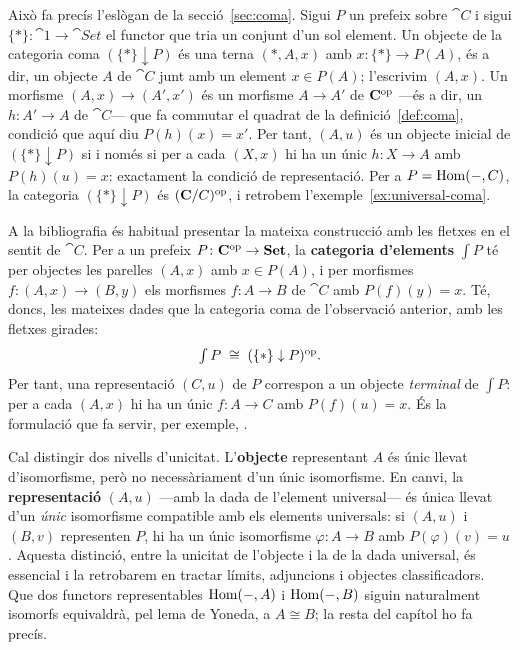 \begin{observacio}\label{obs:representacio-inicial}
Això fa precís l'eslògan de la secció~\ref{sec:coma}. Sigui
$P$ un prefeix sobre $\cat{C}$ i sigui
$\{\ast\}\colon\cat{1}\to\cat{Set}$ el functor que tria un conjunt d'un sol
element. Un objecte de la categoria coma $(\{\ast\}\downarrow P)$ és una terna
$(\ast,A,x)$ amb $x\colon\{\ast\}\to P(A)$, és a dir, un objecte $A$ de
$\cat{C}$ junt amb un element $x\in P(A)$; l'escrivim $(A,x)$. Un morfisme
$(A,x)\to(A',x')$ és un morfisme $A\to A'$ de $\mathbf{C}^{\mathrm{op}}$ ---és a dir, un
$h\colon A'\to A$ de $\cat{C}$--- que fa commutar el quadrat de la
definició~\ref{def:coma}, condició que aquí diu $P(h)(x)=x'$. Per tant,
$(A,u)$ és un objecte inicial de $(\{\ast\}\downarrow P)$ si i només si per a
cada $(X,x)$ hi ha un únic $h\colon X\to A$ amb $P(h)(u)=x$: exactament la
condició de representació. Per a $P=\operatorname{Hom}(-,C)$, la categoria
$(\{\ast\}\downarrow P)$ és $(\mathbf{C}/C)^{\mathrm{op}}$, i retrobem
l'exemple~\ref{ex:universal-coma}.
\end{observacio}

\begin{observacio}\label{obs:categoria-elements}
A la bibliografia és habitual presentar la mateixa construcció amb les fletxes en el sentit de $\cat{C}$. Per a un prefeix $P\colon\mathbf{C}^{\mathrm{op}}\to\mathbf{Set}$, la \textbf{categoria d'elements} $\textstyle\int P$ té per objectes les parelles $(A,x)$ amb $x\in P(A)$, i per morfismes $f\colon(A,x)\to(B,y)$ els morfismes $f\colon A\to B$ de $\cat{C}$ amb $P(f)(y)=x$. Té, doncs, les mateixes dades que la categoria coma de l'observació anterior, amb les fletxes girades:
\[
\textstyle\int P\;\cong\;(\{\ast\}\downarrow P)^{\mathrm{op}}.
\]
Per tant, una representació $(C,u)$ de $P$ correspon a un objecte \emph{terminal} de $\int P$: per a cada $(A,x)$ hi ha un únic $f\colon A\to C$ amb $P(f)(u)=x$. És la formulació que fa servir, per exemple, \cite[cap.~2]{riehl}.
\end{observacio}

\begin{observacio}
Cal distingir dos nivells d'unicitat. L'\textbf{objecte} representant $A$ és únic llevat d'isomorfisme, però no necessàriament d'un únic isomorfisme. En canvi, la \textbf{representació} $(A,u)$ ---amb la dada de l'element universal--- és única llevat d'un \emph{únic} isomorfisme compatible amb els elements universals: si $(A,u)$ i $(B,v)$ representen $P$, hi ha un únic isomorfisme $\varphi\colon A\to B$ amb $P(\varphi)(v)=u$. Aquesta distinció, entre la unicitat de l'objecte i la de la dada universal, és essencial i la retrobarem en tractar límits, adjuncions i objectes classificadors. Que dos functors representables $\operatorname{Hom}(-,A)$ i $\operatorname{Hom}(-,B)$ siguin naturalment isomorfs equivaldrà, pel lema de Yoneda, a $A\cong B$; la resta del capítol ho fa precís.
\end{observacio}

